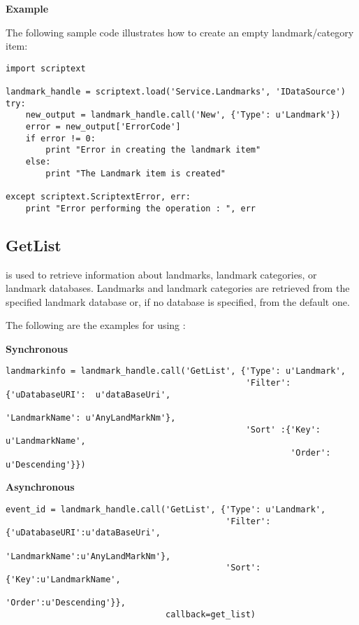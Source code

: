 {\bf Example} \break

The following sample code illustrates how to create an empty landmark/category item:

\begin{verbatim}
import scriptext

landmark_handle = scriptext.load('Service.Landmarks', 'IDataSource')
try:
    new_output = landmark_handle.call('New', {'Type': u'Landmark'})
    error = new_output['ErrorCode']
    if error != 0:
        print "Error in creating the landmark item"
    else:
        print "The Landmark item is created"

except scriptext.ScriptextError, err:
    print "Error performing the operation : ", err
\end{verbatim}

\subsection{GetList}
\label{subsec:landmarkgetlist}

 is used to retrieve information about landmarks, landmark categories, or landmark databases. Landmarks and landmark categories are retrieved from the specified landmark database or, if no database is specified, from the default one.

The following are the examples for using :

{\bf Synchronous} \break

\begin{verbatim}
landmarkinfo = landmark_handle.call('GetList', {'Type': u'Landmark', 
                                                'Filter':{'uDatabaseURI':  u'dataBaseUri', 
                                                          'LandmarkName': u'AnyLandMarkNm'}, 
                                                'Sort' :{'Key': u'LandmarkName', 
                                                         'Order': u'Descending'}})
\end{verbatim}

{\bf Asynchronous} \break

\begin{verbatim}
event_id = landmark_handle.call('GetList', {'Type': u'Landmark',
                                            'Filter':{'uDatabaseURI':u'dataBaseUri',
                                                      'LandmarkName':u'AnyLandMarkNm'},
                                            'Sort':{'Key':u'LandmarkName',
                                                    'Order':u'Descending'}}, 
                                callback=get_list)
\end{verbatim}

